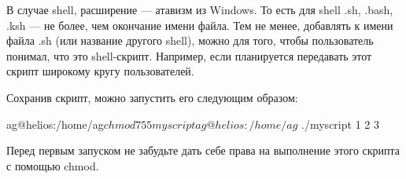 В случае shell, расширение --- атавизм из Windows. То есть для shell .sh, .bash, .ksh --- не более, чем окончание имени файла. 
Тем не менее, добавлять к имени файла .sh (или название другого shell), можно для того, чтобы пользователь понимал, что это shell-скрипт. Например, если планируется передавать этот скрипт широкому кругу пользователей.

Сохранив скрипт, можно запустить его следующим образом:

\begin{shCode}{ }
		ag@helios:/home/ag$ chmod 755 myscript
		ag@helios:/home/ag$ ./myscript 1 2 3 \end{shCode}
		
\begin{important}
	Перед первым запуском не забудьте дать себе права на выполнение этого скрипта с помощью chmod.
\end{important}